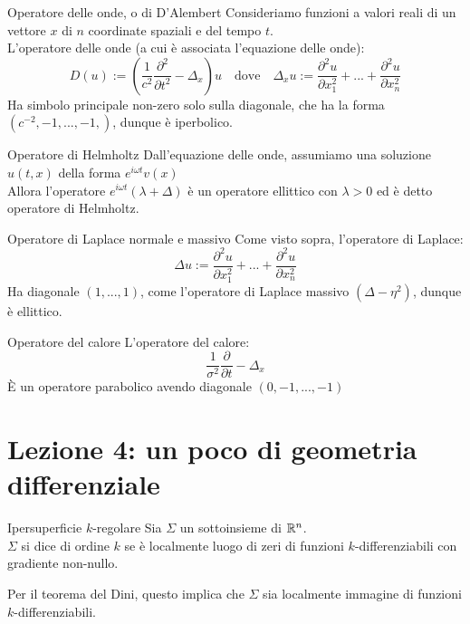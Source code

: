 \documentclass{article}
\begin{document}
\begin{example}{Operatore delle onde, o di D'Alembert}{}
    Consideriamo funzioni a valori reali di un vettore $x$ di $n$ coordinate spaziali e del tempo $t$.\\
    L'operatore delle onde (a cui è associata l'equazione delle onde):
    \[ D(u) := \left(\frac{1}{c^2}\frac{\partial^2}{\partial t^2} - \Delta_x\right) u \quad \text{dove}\quad \Delta_x u := \frac{\partial^2 u}{\partial x_1^2} +...+ \frac{\partial^2 u}{\partial x_n^2}\]
    Ha simbolo principale non-zero solo sulla diagonale, che ha la forma $(c^{-2},-1,...,-1,)$, dunque è iperbolico.
\end{example}

\begin{example}{Operatore di Helmholtz}{}
    Dall'equazione delle onde, assumiamo una soluzione $u(t,x)$ della forma $e^{i\omega t}v(x)$\\
    Allora l'operatore $e^{i\omega t}(\lambda + \Delta)$ è un operatore ellittico con $\lambda>0$ ed è detto operatore di Helmholtz.
\end{example}

\begin{example}{Operatore di Laplace normale e massivo}{}
    Come visto sopra, l'operatore di Laplace:
    \[\Delta u := \frac{\partial^2 u}{\partial x_1^2} +...+ \frac{\partial^2 u}{\partial x_n^2}\]
    Ha diagonale $(1,...,1)$, come l'operatore di Laplace massivo $(\Delta - \eta^2)$, dunque è ellittico.
\end{example}

\begin{example}{Operatore del calore}{}
    L'operatore del calore:
    \[\frac{1}{\sigma^2} \frac{\partial}{\partial t} - \Delta_x\]
    È un operatore parabolico avendo diagonale $(0,-1,...,-1)$
\end{example}

\section{Lezione 4: un poco di geometria differenziale}

\begin{definition}{Ipersuperficie $k$-regolare}{}
    Sia $\Sigma$ un sottoinsieme di $\mathbb{R}^n$.\\
    $\Sigma$ si dice  di ordine $k$ se è localmente luogo di zeri di funzioni $k$-differenziabili con gradiente non-nullo.
\end{definition}

\begin{remark}{}{}
    Per il teorema del Dini, questo implica che $\Sigma$ sia localmente immagine di funzioni $k$-differenziabili.
\end{remark}
\end{document}
